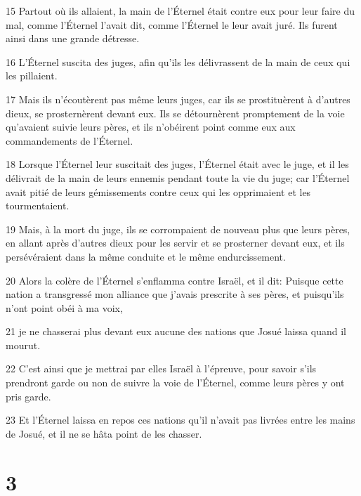 \par 15 Partout où ils allaient, la main de l'Éternel était contre eux pour leur faire du mal, comme l'Éternel l'avait dit, comme l'Éternel le leur avait juré. Ils furent ainsi dans une grande détresse.
\par 16 L'Éternel suscita des juges, afin qu'ils les délivrassent de la main de ceux qui les pillaient.
\par 17 Mais ils n'écoutèrent pas même leurs juges, car ils se prostituèrent à d'autres dieux, se prosternèrent devant eux. Ils se détournèrent promptement de la voie qu'avaient suivie leurs pères, et ils n'obéirent point comme eux aux commandements de l'Éternel.
\par 18 Lorsque l'Éternel leur suscitait des juges, l'Éternel était avec le juge, et il les délivrait de la main de leurs ennemis pendant toute la vie du juge; car l'Éternel avait pitié de leurs gémissements contre ceux qui les opprimaient et les tourmentaient.
\par 19 Mais, à la mort du juge, ils se corrompaient de nouveau plus que leurs pères, en allant après d'autres dieux pour les servir et se prosterner devant eux, et ils persévéraient dans la même conduite et le même endurcissement.
\par 20 Alors la colère de l'Éternel s'enflamma contre Israël, et il dit: Puisque cette nation a transgressé mon alliance que j'avais prescrite à ses pères, et puisqu'ils n'ont point obéi à ma voix,
\par 21 je ne chasserai plus devant eux aucune des nations que Josué laissa quand il mourut.
\par 22 C'est ainsi que je mettrai par elles Israël à l'épreuve, pour savoir s'ils prendront garde ou non de suivre la voie de l'Éternel, comme leurs pères y ont pris garde.
\par 23 Et l'Éternel laissa en repos ces nations qu'il n'avait pas livrées entre les mains de Josué, et il ne se hâta point de les chasser.

\chapter{3}


